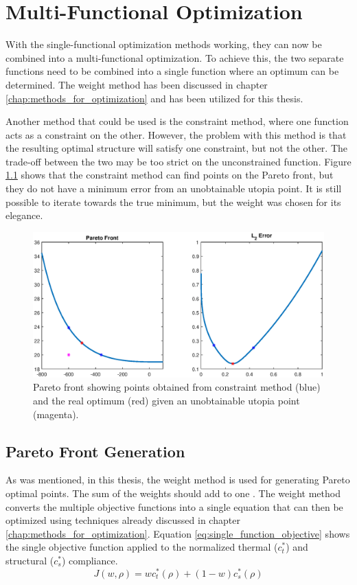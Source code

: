 \chapter{Multi-Functional Optimization}
\label{chap:multi-functional_optimization}
With the single-functional optimization methods working, they can now be combined into a multi-functional optimization. To achieve this, the two separate functions need to be combined into a single function where an optimum can be determined. The weight method has been discussed in chapter \ref{chap:methods_for_optimization} and has been utilized for this thesis. 

Another method that could be used is the constraint method, where one function acts as a constraint on the other. However, the problem with this method is that the resulting optimal structure will satisfy one constraint, but not the other. The trade-off between the two may be too strict on the unconstrained function. Figure \ref{fig:constraint_optimal_point} shows that the constraint method can find points on the Pareto front, but they do not have a minimum error from an unobtainable utopia point. It is still possible to iterate towards the true minimum, but the weight was chosen for its elegance. 
\begin{figure}[ht]
    \centering
    \includegraphics[width=0.95\linewidth]{figures/chapter_5/ConstraintMethoLimitation.eps}
    \caption{Pareto front showing points obtained from constraint method (blue) and the real optimum (red) given an unobtainable utopia point (magenta).}
    \label{fig:constraint_optimal_point}
\end{figure}


\section{Pareto Front Generation}
As was mentioned, in this thesis, the weight method is used for generating Pareto optimal points. The sum of the weights should add to one \cite{Kochenderfer_Wheeler_2019}. The weight method converts the multiple objective functions into a single equation that can then be optimized using techniques already discussed in chapter \ref{chap:methods_for_optimization}. Equation \ref{eq:single_function_objective} shows the single objective function applied to the normalized thermal ($c^*_t$) and structural ($c^*_s$) compliance.
\begin{equation}
    J(w,\rho) = w c^*_t(\rho) + (1 - w)c^*_s(\rho)
    \label{eq:single_function_objective}
\end{equation}

